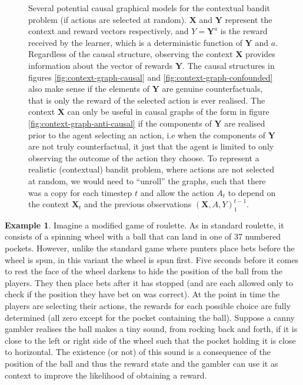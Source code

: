 \documentclass[11pt,a4paper,twoside]{report}
\renewcommand{\vec}[1]{\boldsymbol{#1}}
\newcommand{\quotes}[1]{``#1''}
\theoremstyle{plain}
\theoremstyle{definition}
\newtheorem{example}[theorem]{Example}
\begin{document}
\begin{figure}[ht]
\caption{Several potential causal graphical models for the contextual bandit problem (if actions are selected at random). $\vec{X}$ and $\vec{Y}$ represent the context and reward vectors respectively, and $Y = \vec{Y}^a$ is the reward received by the learner, which is a deterministic function of $\vec{Y}$ and $a$. Regardless of the causal structure, observing the context $\vec{X}$ provides information about the vector of rewards $\vec{Y}$. The causal structures in figures \ref{fig:context-graph-causal} and \ref{fig:context-graph-confounded} also make sense if the elements of $\vec{Y}$ are genuine counterfactuals, that is only the reward of the selected action is ever realised. The context $\vec{X}$ can only be useful in causal graphs of the form in figure \ref{fig:context-graph-anti-causal} if the components of $\vec{Y}$ are realised prior to the agent selecting an action, i.e when the components of $\vec{Y}$ are not truly counterfactual, it just that the agent is limited to only observing the outcome of the action they choose.  To represent a realistic (contextual) bandit problem, where actions are not selected at random, we would need to \quotes{unroll} the graphs, such that there was a copy for each timestep $t$ and allow the action $A_t$ to depend on the context $\vec{X}_t$ and the previous observations $(\vec{X},A,Y)_1^{t-1}$. }
\label{fig:contextual-bandit-causal-graph}
\end{figure}

\vspace{0.5cm}
\begin{example}
\label{exm:anti-casual-context}
Imagine a modified game of roulette. As in standard roulette, it consists of a spinning wheel with a ball that can land in one of 37 numbered pockets. However, unlike the standard game where punters place bets before the wheel is spun, in this variant the wheel is spun first. Five seconds before it comes to rest the face of the wheel darkens to hide the position of the ball from the players. They then place bets after it has stopped (and are each allowed only to check if the position they have bet on was correct). At the point in time the players are selecting their actions, the rewards for each possible choice are fully determined (all zero except for the pocket containing the ball). Suppose a canny gambler realises the ball makes a tiny sound, from rocking back and forth, if it is close to the left or right side of the wheel such that the pocket holding it is close to horizontal. The existence (or not) of this sound is a consequence of the position of the ball and thus the reward state and the gambler can use it as context to improve the likelihood of obtaining a reward.
\end{example}
\end{document}
